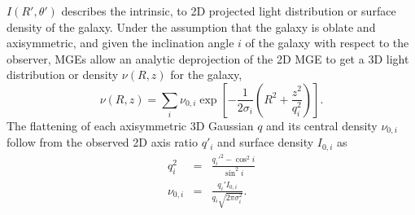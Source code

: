$I(R',\theta')$ describes the intrinsic, to 2D projected light distribution or surface density of the galaxy. Under the assumption that the galaxy is oblate and axisymmetric, and given the inclination angle $i$ of the galaxy with respect to the observer, MGEs allow an analytic deprojection of the 2D MGE to get a 3D light distribution or density $\nu(R,z)$ for the galaxy,
\begin{equation}
\nu(R,z) = \sum_i \nu_{0,i} \exp \left[-\frac{1}{2\sigma_i}\left(R^2 + \frac{z^2}{q_i^2} \right) \right]. \label{eq:deprojMGE}
\end{equation}
The flattening of each axisymmetric 3D Gaussian $q$ and its central density $\nu_{0,i}$ follow from the observed 2D axis ratio $q'_i$ and surface density $I_{0,i}$ as
\begin{eqnarray*}
q_i^2 &=& \frac{q_i'^2 - \cos^2 i}{\sin^2 i}\\
\nu_{0,i} &=& \frac{q_i' I_{0,i}}{q_i \sqrt{2 \pi \sigma_i^2}}.
\end{eqnarray*}


